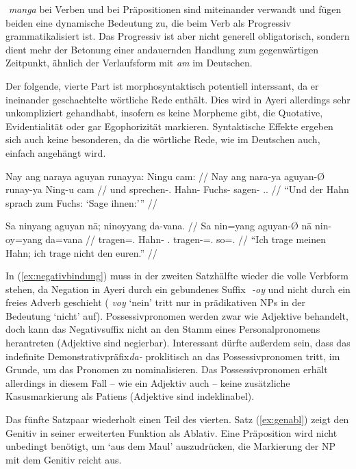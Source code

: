 \documentclass[12pt,paper=a4]{scrartcl}
\newcommand{\TsgM}{{\Tsg}.{\M}}
\newcommand{\TplM}{{\Tpl}.{\M}}
\newcommand{\fw}[1]{\textit{#1}} %
\newcommand{\zwsp}{\mbox{​}} %
\newcommand{\rayr}[2]{\zwsp\smash{{\Tagati #1}} \emph{#2}} %
\newcommand{\xayr}[3]{\zwsp\smash{\Tagati #1} \emph{#2} `#3'} %
\begin{document}
\rayr{mN}{manga} bei Verben und bei Präpositionen sind miteinander verwandt und fügen beiden eine dynamische Bedeutung zu, die beim Verb als Progressiv grammatikalisiert ist. Das Progressiv ist aber nicht generell obligatorisch, sondern dient mehr der Betonung einer andauernden Handlung zum gegenwärtigen Zeitpunkt, ähnlich der Verlaufsform mit \fw{am} im Deutschen.

Der folgende, vierte Part ist morphosyntaktisch potentiell interssant, da er ineinander geschachtelte wörtliche Rede enthält. Dies wird in Ayeri allerdings sehr unkompliziert gehandhabt, insofern es keine Morpheme gibt, die Quotative, Evidentialität oder gar Egophorizität markieren. Syntaktische Effekte ergeben sich auch keine besonderen, da die wörtliche Rede, wie im Deutschen auch, einfach angehängt wird.

\pex %
\a\begingl
	\gla Nay ang naraya aguyan runayya: Ningu cam: //
	\glb Nay ang nara-ya aguyan-Ø runay-ya Ning-u cam //
	\glc und \AgtT{} sprechen-\TsgM{} Hahn-\Top{} Fuchs-\Loc{} sagen-\Imp{} \TplM{}.\Dat{} //
	\glft \enquote{Und der Hahn sprach zum Fuchs: \enquote{Sage ihnen:}} //
\endgl

\a\label{ex:negativbindung}\begingl
	\gla Sa ninyang aguyan nā; ninoyyang da-vana. //
	\glb Sa nin=yang aguyan-Ø nā nin-oy=yang da=vana //
	\glc \PatT{} tragen=\Fsg{}.\Aarg{} Hahn-\Top{} \Fsg{}.\Gen{} tragen-\Neg{}=\Fsg{}.\Aarg{} so=\Spl{}.\Gen{} //
	\glft \enquote{Ich trage meinen Hahn; ich trage nicht den euren.} //
\endgl

\xe

In (\ref{ex:negativbindung}) muss in der zweiten Satzhälfte wieder die volle Verbform stehen, da Negation in Ayeri durch ein gebundenes Suffix \rayr{/Oj}{-oy} und nicht durch ein freies Adverb geschieht (\xayr{voj}{voy}{nein} tritt nur in prädikativen NPs in der Bedeutung `nicht' auf). Possessivpronomen werden zwar wie Adjektive behandelt, doch kann das Negativsuffix nicht an den Stamm eines Personalpronomens herantreten (Adjektive sind negierbar). Interessant dürfte außerdem sein, dass das indefinite Demonstrativpräfix \rayr{d/}{da-} proklitisch an das Possessivpronomen tritt, im Grunde, um das Pronomen zu nominalisieren. Das Possessivpronomen erhält allerdings in diesem Fall -- wie ein Adjektiv auch -- keine zusätzliche Kasusmarkierung als Patiens (Adjektive sind indeklinabel).

Das fünfte Satzpaar wiederholt einen Teil des vierten. Satz (\ref{ex:genabl}) zeigt den Genitiv in seiner erweiterten Funktion als Ablativ. Eine Präposition wird nicht unbedingt benötigt, um `aus dem Maul' auszudrücken, die Markierung der NP mit dem Genitiv reicht aus.
\end{document}
